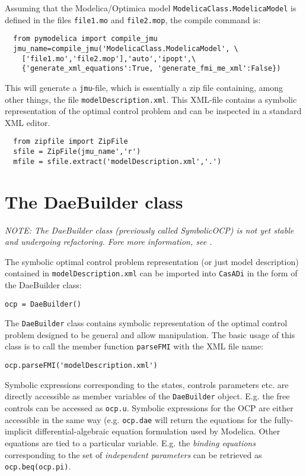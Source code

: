 \documentclass[a4paper,12pt]{book}
\newcommand{\CasADi}{\texttt{CasADi}\xspace}
\begin{document}
Assuming that the Modelica/Optimica model \texttt{ModelicaClass.ModelicaModel} is defined in the files \texttt{file1.mo} and \texttt{file2.mop}, the compile command is:
\begin{verbatim}
  from pymodelica import compile_jmu
  jmu_name=compile_jmu('ModelicaClass.ModelicaModel', \
    ['file1.mo','file2.mop'],'auto','ipopt',\
    {'generate_xml_equations':True, 'generate_fmi_me_xml':False})
\end{verbatim}

This will generate a \texttt{jmu}-file, which is essentially a zip file containing, among other things, the file \texttt{modelDescription.xml}. This XML-file contains a symbolic representation of the optimal control problem and can be inspected in a standard XML editor.
\begin{verbatim}
  from zipfile import ZipFile
  sfile = ZipFile(jmu_name','r')
  mfile = sfile.extract('modelDescription.xml','.')
\end{verbatim}

\section{The DaeBuilder class} \label{sec:modelica_import}
\emph{NOTE: The DaeBuilder class (previously called SymbolicOCP) is not yet stable and undergoing refactoring. Fore more information, see .}

The symbolic optimal control problem representation (or just model description) contained in \texttt{modelDescription.xml} can be imported into \CasADi in the form of the DaeBuilder class:
\begin{verbatim}
ocp = DaeBuilder()
\end{verbatim}

The \texttt{DaeBuilder} class contains symbolic representation of the optimal control problem designed to be general and allow manipulation. The basic usage of this class is to call the member function \texttt{parseFMI} with the XML file name:
\begin{verbatim}
ocp.parseFMI('modelDescription.xml')
\end{verbatim}

Symbolic expressions corresponding to the states, controls parameters etc. are directly accessible as member variables of the \texttt{DaeBuilder} object. E.g. the free controls can be accessed as \verb|ocp.u|. Symbolic expressions for the OCP are either accessible in the same way (e.g. \verb|ocp.dae| will return the equations for the fully-implicit differential-algebraic equation formulation used by Modelica. Other equations are tied to a particular variable. E.g. the \emph{binding equations} corresponding to the set of \emph{independent parameters} can be retrieved as \verb|ocp.beq(ocp.pi)|.
\end{document}
